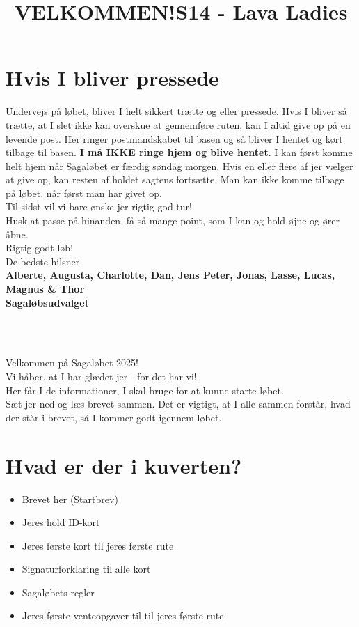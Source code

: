 \section{Hvis I bliver pressede}
Undervejs på løbet, bliver I helt sikkert trætte og eller pressede. Hvis I bliver så trætte, at I slet ikke kan overskue at gennemføre ruten, kan I altid give op på en levende post. Her ringer postmandskabet til basen og så bliver I hentet og kørt tilbage til basen. \textbf{I må IKKE ringe hjem og blive hentet}. I kan først komme helt hjem når Sagaløbet er færdig søndag morgen. Hvis en eller flere af jer vælger at give op, kan resten af holdet sagtens fortsætte. Man kan ikke komme tilbage på løbet, når først man har givet op.\\
\newline
Til sidst vil vi bare ønske jer rigtig god tur!\\
Husk at passe på hinanden, få så mange point, som I kan og hold øjne og ører åbne.\\
\newline
Rigtig godt løb!\\
\newline
\textcolor{søblå}{De bedste hilsner}\\
\textcolor{natblå}{\textbf{Alberte, Augusta, Charlotte, Dan, Jens Peter, Jonas, Lasse, Lucas, Magnus \& Thor}}\\
\textcolor{natblå}{\textbf{Sagaløbsudvalget}}\\
\newpage
\title{VELKOMMEN!}\\
\newline
\title{\textcolor{flammefarvet}{S14 - Lava Ladies }}\\
\newline
Velkommen på Sagaløbet 2025!\\
Vi håber, at I har glædet jer - for det har vi!\\
Her får I de informationer, I skal bruge for at kunne starte løbet.\\
Sæt jer ned og læs brevet sammen. Det er vigtigt, at I alle sammen forstår, hvad der står i brevet, så I kommer godt igennem løbet.
\section{Hvad er der i kuverten?}
\begin{itemize}
    \item Brevet her (Startbrev)
    \item Jeres hold ID-kort
    \item Jeres første kort til jeres første rute
    \item Signaturforklaring til alle kort
    \item Sagaløbets regler
    \item Jeres første venteopgaver til til jeres første rute
\end{itemize}
